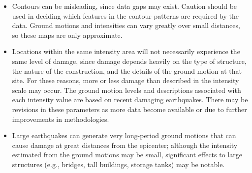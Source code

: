 \documentclass[letterpaper,10pt,english]{sphinxmanual}
\begin{document}
\begin{itemize}
\item {} 
Contours can be misleading, since data gaps may exist. Caution should be used
in deciding which features in the contour patterns are required by the data.
Ground motions and intensities can vary greatly over small distances, so these
maps are only approximate.

\item {} 
Locations within the same intensity area will not necessarily experience the
same level of damage, since damage depends heavily on the type of structure,
the nature of the construction, and the details of the ground motion at that
site. For these reasons, more or less damage than described in the intensity
scale may occur. The ground motion levels and descriptions associated with
each intensity value are based on recent damaging earthquakes. There may be
revisions in these parameters as more data become available or due to further
improvements in methodologies.

\item {} 
Large earthquakes can generate very long-period ground motions that can cause
damage at great distances from the epicenter; although the intensity estimated
from the ground motions may be small, significant effects to large structures
(e.g., bridges, tall buildings, storage tanks) may be notable.


\end{itemize}
\end{document}
